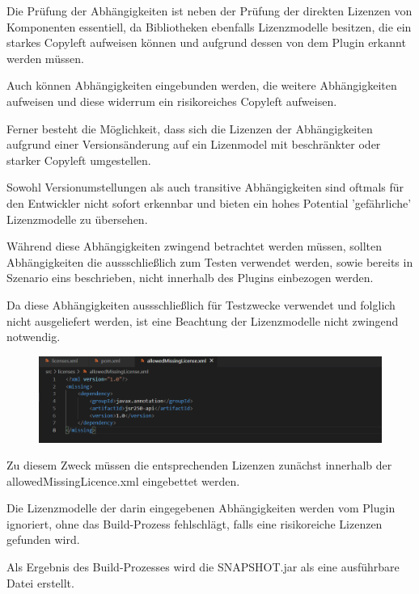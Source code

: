Die Prüfung der Abhängigkeiten ist neben der Prüfung der direkten Lizenzen von Komponenten essentiell, da Bibliotheken ebenfalls Lizenzmodelle besitzen, die ein starkes Copyleft aufweisen können und aufgrund dessen von dem Plugin erkannt werden müssen. 

Auch können Abhängigkeiten eingebunden werden, die weitere Abhängigkeiten aufweisen und diese widerrum ein risikoreiches Copyleft aufweisen. 

Ferner besteht die Möglichkeit, dass sich die Lizenzen der Abhängigkeiten aufgrund einer Versionsänderung auf ein Lizenmodel mit beschränkter oder starker Copyleft umgestellen.  

Sowohl Versionumstellungen als auch transitive Abhängigkeiten sind oftmals für den Entwickler nicht sofort erkennbar und bieten ein hohes Potential 'gefährliche' Lizenzmodelle zu übersehen. 

Während diese Abhängigkeiten zwingend betrachtet werden müssen, sollten Abhängigkeiten die aussschließlich zum Testen verwendet werden, sowie bereits in Szenario eins beschrieben, nicht innerhalb des Plugins einbezogen werden. 

Da diese Abhängigkeiten aussschließlich für Testzwecke verwendet und folglich nicht ausgeliefert werden, ist eine Beachtung der Lizenzmodelle nicht zwingend notwendig. 

\begin{figure}[h]
    \centering
    \includegraphics[scale=0.5]{Bilder/allowedmiisingLicence.png}
\end{figure}

Zu diesem Zweck müssen die entsprechenden Lizenzen zunächst innerhalb der allowedMissingLicence.xml eingebettet werden.

Die Lizenzmodelle der darin eingegebenen Abhängigkeiten werden vom Plugin ignoriert, ohne das Build-Prozess fehlschlägt, falls eine risikoreiche Lizenzen gefunden wird. 

Als Ergebnis des Build-Prozesses wird die SNAPSHOT.jar als eine ausführbare Datei erstellt. 
















